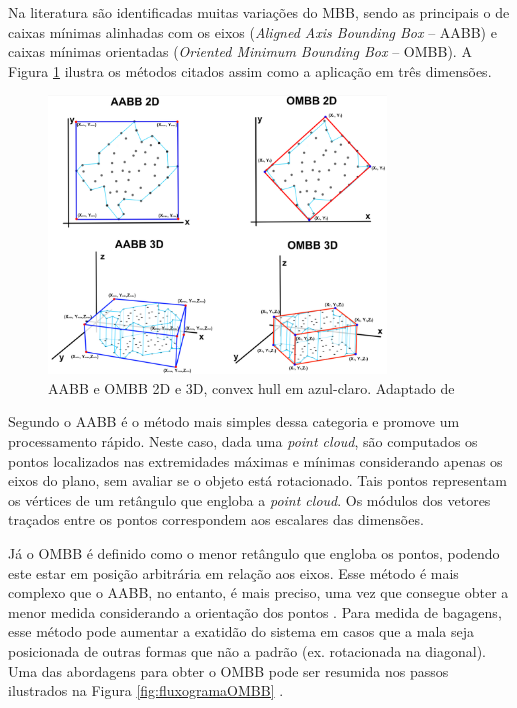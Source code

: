     Na literatura são identificadas muitas variações do MBB, sendo as principais o de caixas mínimas alinhadas com os eixos (\textit{Aligned Axis Bounding Box} -- AABB) e caixas mínimas orientadas (\textit{Oriented Minimum Bounding Box} -- OMBB). A Figura \ref{fig:MBBsilustracoes} ilustra os métodos citados assim como a aplicação em três dimensões.

        \begin{figure}[h]
           \centering
           \includegraphics[width=0.8\textwidth]{imagens/MBBs ilustracoes.png} 
           \caption{AABB e OMBB 2D e 3D, convex hull em azul-claro. Adaptado de \cite{david_2014_computing}}
           \label{fig:MBBsilustracoes}
        \end{figure}
    
    Segundo  o AABB é o método mais simples dessa categoria e promove um processamento rápido. Neste caso, dada uma \textit{point cloud}, são computados os pontos localizados nas extremidades máximas e mínimas considerando apenas os eixos do plano, sem avaliar se o objeto está rotacionado. Tais pontos representam os vértices de um retângulo que engloba a \textit{point cloud}.  Os módulos dos vetores traçados entre os pontos correspondem aos escalares das dimensões.

    Já o OMBB é definido como o menor retângulo que engloba os pontos, podendo este estar em posição arbitrária em relação aos eixos. Esse método é mais complexo que o AABB, no entanto, é mais preciso, uma vez que consegue obter a menor medida considerando a orientação dos pontos \cite{siwei_2021_review}. Para medida de bagagens, esse método pode aumentar a exatidão do sistema em casos que a mala seja posicionada de outras formas que não a padrão (ex. rotacionada na diagonal). Uma das abordagens para obter o OMBB pode ser resumida nos passos ilustrados na  Figura \ref{fig:fluxogramaOMBB} \cite{david_2014_computing}.

